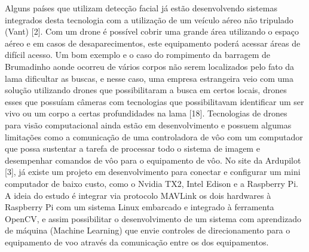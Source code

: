 Alguns países que utilizam detecção facial já estão desenvolvendo sistemas integrados desta tecnologia com a utilização de um veículo aéreo não tripulado (Vant) \cite{dois} [2]. Com um drone é possível cobrir uma grande área utilizando o espaço aéreo e em casos de desaparecimentos, este equipamento poderá acessar áreas de difícil acesso. Um bom exemplo e o caso do rompimento da barragem de Brumadinho aonde ocorreu de vários corpos não serem localizados pelo fato da lama dificultar as buscas, e nesse caso, uma empresa estrangeira veio com uma solução utilizando drones que possibilitaram a busca em certos locais, drones esses que possuíam câmeras com tecnologias que possibilitavam identificar um ser vivo ou um corpo a certas profundidades na lama [18].  
Tecnologias de drones para visão computacional ainda estão em desenvolvimento e possuem algumas limitações como a comunicação de uma controladora de vôo com um computador que possa sustentar a tarefa de processar todo o sistema de imagem e desempenhar comandos de vôo para o equipamento de vôo.
No site da Ardupilot \cite{tres}[3], já existe um projeto em desenvolvimento para conectar e configurar um mini computador de baixo custo, como o Nvidia TX2, Intel Edison e a Raspberry Pi. A ideia do estudo é integrar via protocolo MAVLink os dois hardwares à Raspberry Pi com um sistema Linux embarcado e integrado à ferramenta OpenCV, e assim possibilitar o desenvolvimento de um sistema com aprendizado de máquina (Machine Learning) que envie controles de direcionamento para o equipamento de voo através da comunicação entre os dos equipamentos.  







